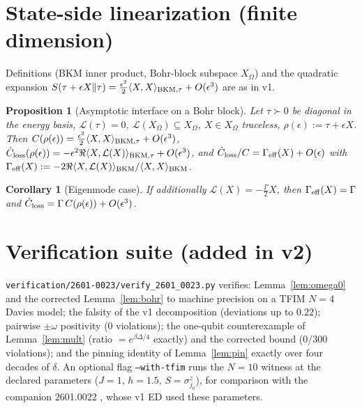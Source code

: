 \documentclass[11pt]{article}
\newtheorem{proposition}[theorem]{Proposition}
\newtheorem{corollary}[theorem]{Corollary}
\theoremstyle{remark}
\begin{document}
\section{State-side linearization (finite dimension)}
Definitions (BKM inner product, Bohr-block subspace $X_\Omega$) and the
quadratic expansion $S(\tau + \epsilon X\|\tau) = \tfrac{\epsilon^2}{2}
\langle X, X\rangle_{{\rm BKM},\tau} + O(\epsilon^3)$ are as in v1.
\begin{proposition}[Asymptotic interface on a Bohr block]
\label{prop:lin}
Let $\tau \succ 0$ be diagonal in the energy basis, $\mathcal{L}(\tau) =
0$, $\mathcal{L}(X_\Omega) \subseteq X_\Omega$, $X \in X_\Omega$ traceless,
$\rho(\epsilon) := \tau + \epsilon X$. Then $C(\rho(\epsilon)) =
\tfrac{\epsilon^2}{2}\langle X, X\rangle_{{\rm BKM},\tau} + O(\epsilon^3)$,
$\dot C_{\rm loss}(\rho(\epsilon)) = -\epsilon^2 \Re\langle X,
\mathcal{L}(X)\rangle_{{\rm BKM},\tau} + O(\epsilon^3)$, and
$\dot C_{\rm loss}/C = \Gamma_{\rm eff}(X) + O(\epsilon)$ with
$\Gamma_{\rm eff}(X) := -2\Re\langle X, \mathcal{L}(X)\rangle_{\rm BKM} /
\langle X, X\rangle_{\rm BKM}$.
\end{proposition}
\begin{corollary}[Eigenmode case]
\label{cor:eig}
If additionally $\mathcal{L}(X) = -\tfrac{\Gamma}{2}X$, then
$\Gamma_{\rm eff}(X) = \Gamma$ and $\dot C_{\rm loss} = \Gamma\,
C(\rho(\epsilon)) + O(\epsilon^3)$.
\end{corollary}

\section{Verification suite (added in v2)}
\label{sec:verif}
\texttt{verification/2601-0023/verify\_2601\_0023.py} verifies:
Lemma~\ref{lem:omega0} and the corrected Lemma~\ref{lem:bohr} to
machine precision on a TFIM $N = 4$ Davies model; the falsity of the v1
decomposition (deviations up to $0.22$); pairwise $\pm\omega$ positivity
(0 violations); the one-qubit counterexample of Lemma~\ref{lem:mult}
(ratio $= e^{\beta\Delta/4}$ exactly) and the corrected bound (0/300
violations); and the pinning identity of Lemma~\ref{lem:pin} exactly over
four decades of $\delta$. An optional flag \texttt{--with-tfim} runs the
$N = 10$ witness at the declared parameters ($J = 1$, $h = 1.5$,
$S = \sigma^z_{j_0}$), for comparison with the companion 2601.0022
\cite{S0022}, whose v1 ED used these parameters.
\end{document}
